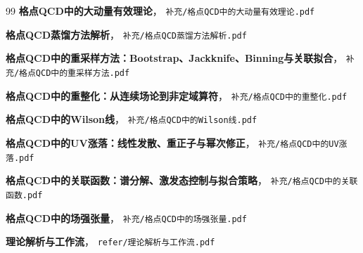 \documentclass[12pt,a4paper]{ctexart}
\theoremstyle{definition}
\begin{document}
\begin{thebibliography}{99}
\textbf{格点QCD中的大动量有效理论}，
\texttt{补充/格点QCD中的大动量有效理论.pdf}

\textbf{格点QCD蒸馏方法解析}，
\texttt{补充/格点QCD蒸馏方法解析.pdf}

\textbf{格点QCD中的重采样方法：Bootstrap、Jackknife、Binning与关联拟合}，
\texttt{补充/格点QCD中的重采样方法.pdf}

\textbf{格点QCD中的重整化：从连续场论到非定域算符}，
\texttt{补充/格点QCD中的重整化.pdf}

\textbf{格点QCD中的Wilson线}，
\texttt{补充/格点QCD中的Wilson线.pdf}

\textbf{格点QCD中的UV涨落：线性发散、重正子与幂次修正}，
\texttt{补充/格点QCD中的UV涨落.pdf}

\textbf{格点QCD中的关联函数：谱分解、激发态控制与拟合策略}，
\texttt{补充/格点QCD中的关联函数.pdf}

\textbf{格点QCD中的场强张量}，
\texttt{补充/格点QCD中的场强张量.pdf}

\textbf{理论解析与工作流}，
\texttt{refer/理论解析与工作流.pdf}

\end{thebibliography}
\end{document}
